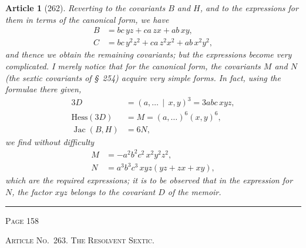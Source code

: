\documentclass[11pt,a4paper]{article}
\theoremstyle{cayley}
\newtheorem{art}{Article}
\DeclareMathOperator{\Jac}{Jac}
\begin{document}
\begin{art}[262]
Reverting to the covariants $B$ and $H$, and to the expressions for them in terms of the canonical form, we have
\begin{align*}
B &= bc\,yz + ca\,zx + ab\,xy, \\
C &= bc\,y^2z^2 + ca\,z^2x^2 + ab\,x^2y^2,
\end{align*}
and thence we obtain the remaining covariants; but the expressions become very complicated. I merely notice that for the canonical form, the covariants $M$ and $N$ (the sextic covariants of \S\ 254) acquire very simple forms. In fact, using the formulae there given,
\begin{align*}
3D &= (a, \ldots \,\mid\, x, y)^3 = 3abc\,xyz, \\
\text{Hess}(3D) &= M = (a, \ldots)^6(x, y)^6, \\
\Jac(B, H) &= 6N,
\end{align*}
we find without difficulty
\begin{align*}
M &= -a^2b^2c^2\,x^2y^2z^2, \\
N &= a^3b^3c^3\,xyz(yz+zx+xy),
\end{align*}
which are the required expressions; it is to be observed that in the expression for $N$, the factor $xyz$ belongs to the covariant $D$ of the memoir.
\end{art}

\vspace{1em}
\noindent\rule{\textwidth}{0.4pt}
\begin{center}\textsc{Page 158}\end{center}
\newpage

\begin{center}
\textsc{Article No.\ 263. The Resolvent Sextic.}
\end{center}
\end{document}
